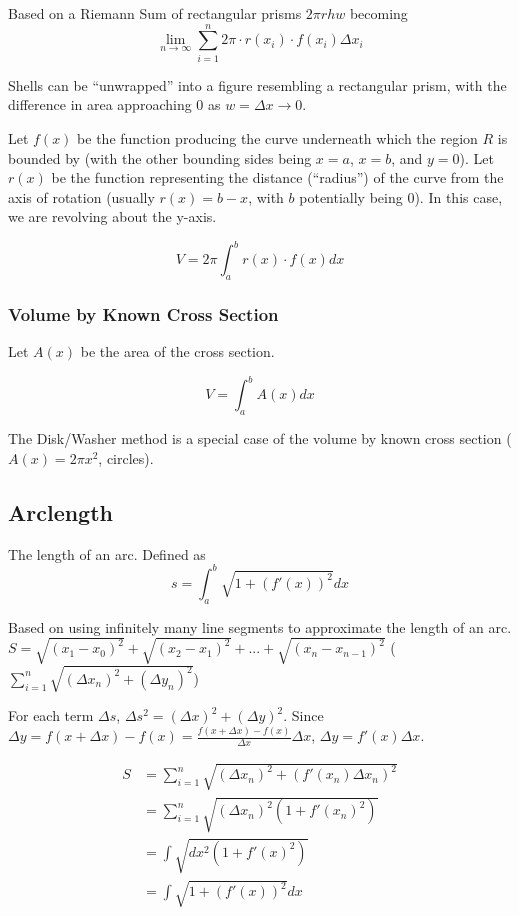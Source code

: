 \documentclass{article}
\begin{document}
Based on a Riemann Sum of rectangular prisms $2 \pi rhw$ becoming
$$\lim_{n \to \infty} \sum_{i=1}^{n} 2 \pi \cdot r(x_i) \cdot f(x_i) \Delta x_i$$

Shells can be ``unwrapped'' into a figure resembling a rectangular prism, with the difference in area approaching $0$ as $w = \Delta x \to 0$.

Let $f(x)$ be the function producing the curve underneath which the region $R$ is bounded by (with the other bounding sides being $x = a$, $x = b$, and $y = 0$). Let $r(x)$ be the function representing the distance (``radius'') of the curve from the axis of rotation (usually $r(x) = b - x$, with $b$ potentially being $0$). In this case, we are revolving about the y-axis.

$$V = 2\pi \int_{a}^{b} r(x) \cdot f(x) dx$$

\subsubsection{Volume by Known Cross Section}
Let $A(x)$ be the area of the cross section.

$$V = \int_{a}^{b} A(x)dx$$

The Disk/Washer method is a special case of the volume by known cross section ($A(x) = 2\pi x^2$, circles).

\subsection{Arclength}
The length of an arc. Defined as
$$ s = \int_{a}^{b} \sqrt{1+(f'(x))^2} dx$$

Based on using infinitely many line segments to approximate the length of an arc.
$S = \sqrt{(x_1-x_0)^2} + \sqrt{(x_2-x_1)^2} + ... + \sqrt{(x_n-x_{n-1})^2}$ ($\sum_{i=1}^n \sqrt{(\Delta x_n)^2 + (\Delta y_n)^2}$)

For each term $\Delta s$, $\Delta s^2 = (\Delta x)^2 + (\Delta y)^2$.
Since  $\Delta y = f(x + \Delta x) - f(x) = \frac{f(x + \Delta x) - f(x)}{\Delta x}\Delta x$, $\Delta y = f'(x)\Delta x$.

\begin{align*}
    S & = \sum_{i=1}^n \sqrt{(\Delta x_n)^2 + (f'(x_n)\Delta x_n)^2} \\
      & = \sum_{i=1}^n \sqrt{(\Delta x_n)^2(1 + f'(x_n)^2)} \\
      & = \int \sqrt{dx^2(1 + f'(x)^2)} \\
      & = \int \sqrt{1 + (f'(x))^2} dx
\end{align*}
\end{document}
